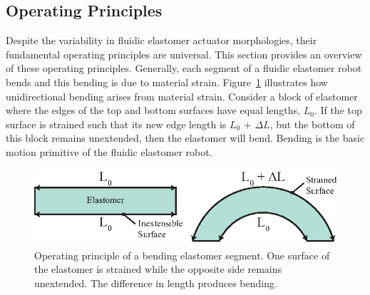 \subsection{Operating Principles}
\label{subsec:Actuators, Operating Principles}
Despite the variability in fluidic elastomer actuator morphologies, their fundamental operating principles are universal.
This section provides an overview of these operating principles.
Generally, each segment of a fluidic elastomer robot bends and this bending is due to material strain.
Figure~\ref{fig:ElastomerBending} illustrates how unidirectional bending arises from material strain.
Consider a block of elastomer where the edges of the top and bottom surfaces have equal lengths, $L_0$.
If the top surface is strained such that its new edge length is $L_0$ + $\Delta L$, but the bottom of this block remains unextended, then the elastomer will bend.
Bending is the basic motion primitive of the fluidic elastomer robot.
\begin{figure}[htb]
\centering
\includegraphics[width=0.85\columnwidth]{figures/actuators/ElastomerBending.eps}
\caption[Operating principle of a bending elastomer segment.]{Operating principle of a bending elastomer segment. One surface of the elastomer is strained while the opposite side remains unextended. The difference in length produces bending.}
\label{fig:ElastomerBending}
\end{figure}

